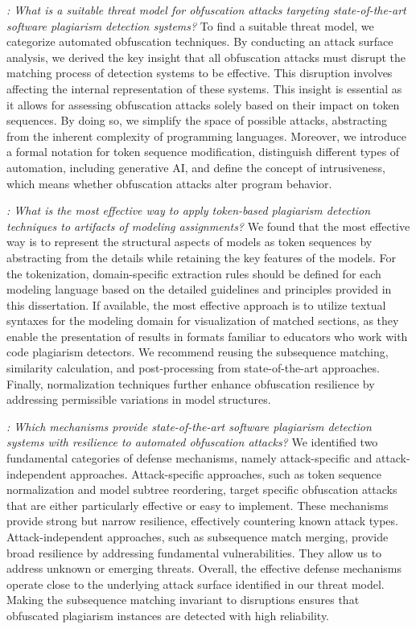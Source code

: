 \textit{: What is a suitable threat model for obfuscation attacks targeting state-of-the-art software plagiarism detection systems?}
%
To find a suitable threat model, we categorize automated obfuscation techniques. By conducting an attack surface analysis, we derived the key insight that all obfuscation attacks must disrupt the matching process of detection systems to be effective. This disruption involves affecting the internal representation of these systems.
%
This insight is essential as it allows for assessing obfuscation attacks solely based on their impact on token sequences. By doing so, we simplify the space of possible attacks, abstracting from the inherent complexity of programming languages. %
Moreover, we introduce a formal notation for token sequence modification, distinguish different types of automation, including generative AI, and define the concept of intrusiveness, which means whether obfuscation attacks alter program behavior.

\textit{: What is the most effective way to apply token-based plagiarism detection techniques to artifacts of modeling assignments?}
%
We found that the most effective way is to represent the structural aspects of models as token sequences by abstracting from the details while retaining the key features of the models.
For the tokenization, domain-specific extraction rules should be defined for each modeling language based on the detailed guidelines and principles provided in this dissertation. If available, the most effective approach is to utilize textual syntaxes for the modeling domain for visualization of matched sections, as they enable the presentation of results in formats familiar to educators who work with code plagiarism detectors.
We recommend reusing the subsequence matching, similarity calculation, and post-processing from state-of-the-art approaches.
%
Finally, normalization techniques further enhance obfuscation resilience by addressing permissible variations in model structures.

\textit{: Which mechanisms provide state-of-the-art software plagiarism detection systems with resilience to automated obfuscation attacks?}
%
We identified two fundamental categories of defense mechanisms, namely attack-specific and attack-independent approaches.
Attack-specific approaches, such as token sequence normalization and model subtree reordering, target specific obfuscation attacks that are either particularly effective or easy to implement. These mechanisms provide strong but narrow resilience, effectively countering known attack types.
Attack-independent approaches, such as subsequence match merging, provide broad resilience by addressing fundamental vulnerabilities. They allow us to address unknown or emerging threats.
Overall, the effective defense mechanisms operate close to the underlying attack surface identified in our threat model. Making the subsequence matching invariant to disruptions ensures that obfuscated plagiarism instances are detected with high reliability.

